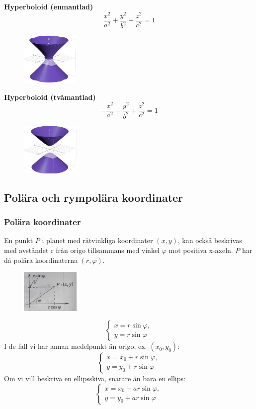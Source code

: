 \documentclass[a4paper,12pt]{article}
\begin{document}
\textbf{Hyperboloid (enmantlad)}
\[
\frac{x^2}{a^2} + \frac{y^2}{b^2} - \frac{z^2}{c^2} = 1
\]
\begin{figure}[H]
  \centering
  \includegraphics[width=0.25\textwidth]{enmantladhyperboloid.png}
  \caption{}
\end{figure}

\textbf{Hyperboloid (tvåmantlad)}
\[
-\frac{x^2}{a^2} - \frac{y^2}{b^2} + \frac{z^2}{c^2} = 1
\]
\begin{figure}[H]
  \centering
  \includegraphics[width=0.25\textwidth]{tvamantladhyperboloid.png}
  \caption{}
\end{figure}

\subsection{Polära och rympolära koordinater}
\subsubsection*{Polära koordinater}
En punkt $P$ i planet med rätvinkliga koordinater $(x, y)$, 
kan också beskrivas med avståndet r från origo tillsammans med vinkel $\varphi$ mot positiva x-axeln.
$P$ har då polära koordinaterna $(r, \varphi)$. 
\begin{figure}[H]
  \centering
  \includegraphics[width=0.25\textwidth]{polarakoordinater.png}
  \caption{}
\end{figure}
\[
\begin{cases}
x = r \sin \varphi, \\
y = r \sin \varphi 
\end{cases}
\]
I de fall vi har annan medelpunkt än origo, ex. $(x_0, y_0)$:
\[
\begin{cases}
x = x_0 + r \sin \varphi, \\
y = y_0 + r \sin \varphi 
\end{cases}
\]
Om vi vill beskriva en ellipsskiva, snarare än bara en ellips:
\[
\begin{cases}
x = x_0 + a r \sin \varphi, \\
y = y_0 + a r \sin \varphi 
\end{cases}
\]
\end{document}
